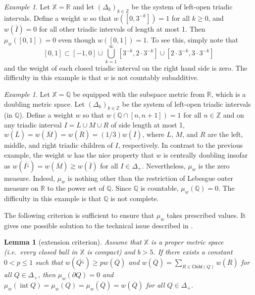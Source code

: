 \documentclass[12pt]{amsart}
\newtheorem{lemma}[theorem]{Lemma}
\theoremstyle{definition}
\theoremstyle{remark}
\newtheorem{example}[theorem]{Example}
\newcommand{\RR}{\mathbb{R}}
\newcommand{\QQ}{\mathbb{Q}}
\newcommand{\ZZ}{\mathbb{Z}}
\newcommand{\XX}{\mathbb{X}}
\newcommand{\interior}{\mathop\mathrm{int}\nolimits}
\newcommand{\Child}{\mathsf{Child}}
\numberwithin{figure}{section}
\numberwithin{equation}{section}
\begin{document}
\begin{example}Let $\XX=\RR$ and let $(\Delta_k)_{k\in\ZZ}$ be the system of left-open triadic intervals. Define a weight $w$ so that $w([0,3^{-k}])=1$ for all $k\geq 0$, and $w(\overline{I})=0$ for all other triadic intervals of length at most 1. Then $\mu_w([0,1])=0$ even though $w([0,1])=1$. To see this, simply note that $$[0,1]\subset[-1,0]\cup\bigcup_{k=1}^\infty [3^{-k},2\cdot 3^{-k}]\cup [2\cdot 3^{-k}, 3\cdot 3^{-k}]$$ and the weight of each closed triadic interval on the right hand side is zero. The difficulty in this example is that $w$ is not countably subadditive.\end{example}

\begin{example}Let $\XX=\QQ$ be equipped with the subspace metric from $\RR$, which is a doubling metric space. Let $(\Delta_k)_{k\in\ZZ}$ be the system of left-open triadic intervals (in $\QQ$). Define a weight $w$ so that $w(\QQ\cap[n,n+1])=1$ for all $n\in\ZZ$ and on any triadic interval $I=L\cup M\cup R$ of side length at most 1, $w(\overline{L})=w(\overline{M})=w(\overline{R})=(1/3)w(\overline{I})$, where $L$, $M$, and $R$ are the left, middle, and right triadic children of $I$, respectively. In contrast to the previous example, the weight $w$ has the nice property that $w$ is centrally doubling insofar as $w(\overline{I^\downarrow})=w(\overline{M})\gtrsim w(\overline{I})$ for all $I\in\Delta_+$. Nevertheless, $\mu_w$ is the zero measure. Indeed, $\mu_w$ is nothing other than the restriction of Lebesgue outer measure on $\RR$ to the power set of $\QQ$. Since $\QQ$ is countable, $\mu_w(\QQ)=0$. The difficulty in this example is that $\QQ$ is not complete.\end{example}

The following criterion is sufficient to ensure that $\mu_w$ takes prescribed values. It gives one possible solution to the technical issue described in \cite[Remark 5.1(1)]{KRS-cubes}.

\begin{lemma}[extension criterion]\label{extension} Assume that $\XX$ is a proper metric space (i.e.~every closed ball in $\XX$ is compact) and $b>5$. If there exists a constant $0<p\leq 1$ such that $w(\overline{Q^\downarrow})\geq p w(\overline{Q})$ and $w(\overline{Q})= \sum_{R\in\Child(Q)}w(\overline{R})$ for all $Q\in\Delta_+$, then $\mu_w(\partial Q)=0$ and $\mu_w(\interior{Q})=\mu_w(Q)=\mu_w(\overline{Q})=w(\overline{Q})$ for all $Q\in\Delta_+$.\end{lemma}
\end{document}
